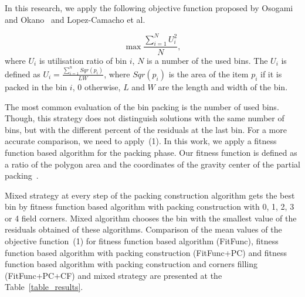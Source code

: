 \documentclass[12pt]{llncs}
\begin{document}
In this research, we apply the following objective function proposed by Osogami and Okano~\cite{Osogami} and Lopez-Camacho et al.~\cite{LopezCamacho}

\begin{equation}
 \max \frac{ \sum_{i=1}^N U_i^2}{N},
 \label{eq9}
\end{equation}
where $U_i$ is utilisation ratio of bin $i$, $N$ is a number of the used bins.  The  $U_i$  is defined as  $U_i = \frac{\sum _{i=1}^n Sqr(p_i) }{LW}$, where $Sqr(p_i)$ is the area of the item $p_i$ if it is packed in the bin $i$, $0$ otherwise, $L$ and $W$ are the length and width of the bin.

The most common evaluation of the bin packing is the number of used bins. Though, this strategy does not distinguish solutions with the same number of bins, but with the different percent of the residuals at the last bin. For a more accurate comparison, we need to apply~(1). In this work, we apply a fitness function based algorithm for the packing phase. Our fitness function is defined as a ratio of the polygon area and the coordinates of the gravity center of the partial packing~\cite{OurFF}. 

Mixed strategy at every step of the packing construction algorithm gets the best bin by fitness function based algorithm with packing construction with 0, 1, 2, 3 or 4 field corners. Mixed algorithm chooses the bin with the smallest value of the residuals obtained of these algorithms. Comparison of the mean values of the objective function~(1) for fitness function based algorithm (FitFunc), fitness function based algorithm with packing construction (FitFunc+PC) and fitness function based algorithm with packing construction and corners filling (FitFunc+PC+CF) and mixed strategy are presented at the Table~\ref{table_results}. 
\end{document}
